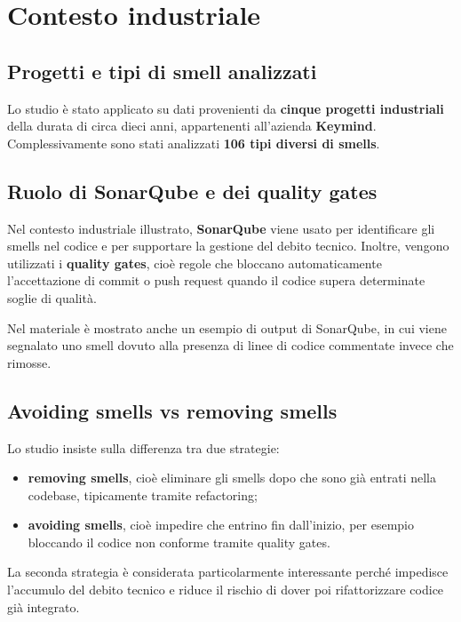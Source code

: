\section{Contesto industriale}

\subsection{Progetti e tipi di smell analizzati}

Lo studio è stato applicato su dati provenienti da \textbf{cinque progetti industriali} della durata di circa dieci anni, appartenenti all'azienda \textbf{Keymind}. Complessivamente sono stati analizzati \textbf{106 tipi diversi di smells}.

\subsection{Ruolo di SonarQube e dei quality gates}

Nel contesto industriale illustrato, \textbf{SonarQube} viene usato per identificare gli smells nel codice e per supportare la gestione del debito tecnico. Inoltre, vengono utilizzati i \textbf{quality gates}, cioè regole che bloccano automaticamente l'accettazione di commit o push request quando il codice supera determinate soglie di qualità.

\begin{notaslide}
Nel materiale è mostrato anche un esempio di output di SonarQube, in cui viene segnalato uno smell dovuto alla presenza di linee di codice commentate invece che rimosse.
\end{notaslide}

\subsection{Avoiding smells vs removing smells}

Lo studio insiste sulla differenza tra due strategie:

\begin{itemize}
    \item \textbf{removing smells}, cioè eliminare gli smells dopo che sono già entrati nella codebase, tipicamente tramite refactoring;
    \item \textbf{avoiding smells}, cioè impedire che entrino fin dall'inizio, per esempio bloccando il codice non conforme tramite quality gates.
\end{itemize}

La seconda strategia è considerata particolarmente interessante perché impedisce l'accumulo del debito tecnico e riduce il rischio di dover poi rifattorizzare codice già integrato.

